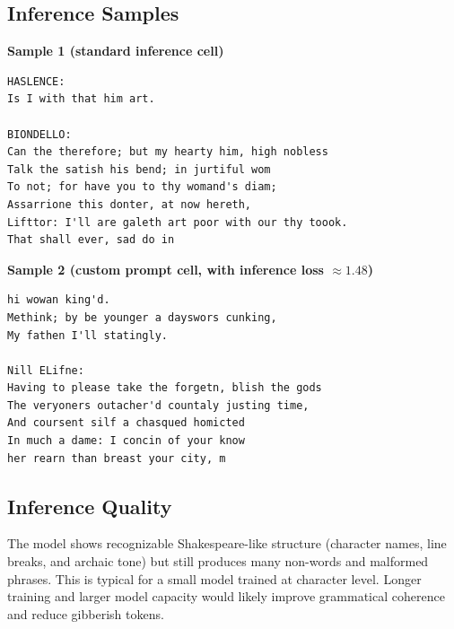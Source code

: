 \documentclass{article}
\begin{document}
\subsection*{Inference Samples}
\textbf{Sample 1 (standard inference cell)}
\begin{verbatim}
HASLENCE:
Is I with that him art.

BIONDELLO:
Can the therefore; but my hearty him, high nobless
Talk the satish his bend; in jurtiful wom
To not; for have you to thy womand's diam;
Assarrione this donter, at now hereth,
Lifttor: I'll are galeth art poor with our thy toook.
That shall ever, sad do in
\end{verbatim}

\textbf{Sample 2 (custom prompt cell, with inference loss $\approx 1.48$)}
\begin{verbatim}
hi wowan king'd.
Methink; by be younger a dayswors cunking,
My fathen I'll statingly.

Nill ELifne:
Having to please take the forgetn, blish the gods
The veryoners outacher'd countaly justing time,
And coursent silf a chasqued homicted
In much a dame: I concin of your know
her rearn than breast your city, m
\end{verbatim}

\subsection*{Inference Quality}
The model shows recognizable Shakespeare-like structure (character names, line breaks, and archaic tone) but still produces many non-words and malformed phrases. This is typical for a small model trained at character level. Longer training and larger model capacity would likely improve grammatical coherence and reduce gibberish tokens.
\end{document}
